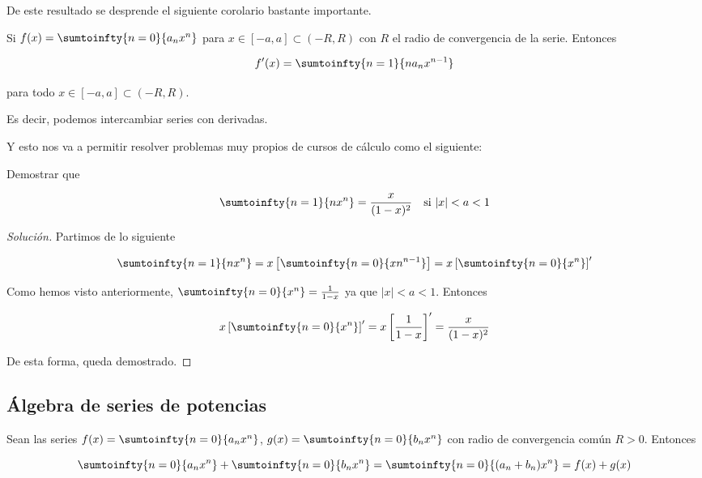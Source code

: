 De este resultado se desprende el siguiente corolario bastante importante.

\begin{cor}
    Si $f(x) = \sumtoinfty{n=0}{a_nx^n}$ para $x \in [-a,a] \subset (-R,R)$ con $R$ el radio de convergencia de la serie. Entonces
    
    \[
    f'(x) = \sumtoinfty{n=1}{na_nx^{n-1}}
    \]
    
    para todo $x \in [-a,a] \subset (-R,R)$.
    
    Es decir, podemos intercambiar series con derivadas.
\end{cor}

Y esto nos va a permitir resolver problemas muy propios de cursos de cálculo como el siguiente:

\begin{ejem}
    Demostrar que
    
    \[
    \sumtoinfty{n=1}{nx^n} = \frac{x}{(1-x)^2} \quad \text{si $|x|<a<1$}
    \]
\end{ejem}

\begin{proof}[Solución]
    Partimos de lo siguiente
    
    \[
    \sumtoinfty{n=1}{nx^n} = x\left[ \sumtoinfty{n=0}{xn^{n-1}} \right] = x\left[\sumtoinfty{n=0}{x^n}\right]'
    \]
    
    Como hemos visto anteriormente, $\sumtoinfty{n=0}{x^n} = \frac{1}{1-x}$ ya que $|x|<a<1$. Entonces
    
    \[
    x\left[\sumtoinfty{n=0}{x^n}\right]' = x\left[\frac{1}{1-x}\right]' = \frac{x}{(1-x)^2}
    \]
    
    De esta forma, queda demostrado.
\end{proof}

\subsection{Álgebra de series de potencias}

\begin{teo}\label{teo:alge1}
    Sean las series $f(x) = \sumtoinfty{n=0}{a_nx^n}$, $g(x) = \sumtoinfty{n=0}{b_nx^n}$ con radio de convergencia común $R > 0$. Entonces
    
    \[
    \sumtoinfty{n=0}{a_nx^n} + \sumtoinfty{n=0}{b_nx^n} = \sumtoinfty{n=0}{(a_n+b_n)x^n} = f(x) + g(x)
    \]
\end{teo}


